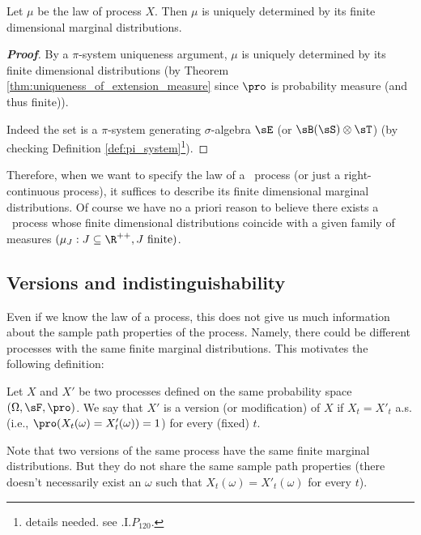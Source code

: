 \begin{proposition}\label{pro:process_law_is_uniquely_determined_by_its_finite_dimensional_marginal_distribution}
Let $\mu$ be the law of process $X$. Then $\mu$ is uniquely determined by its finite dimensional marginal distributions.
\end{proposition}

\begin{proof}[\bf Proof]
By a $\pi$-system uniqueness argument, $\mu$ is uniquely determined by its finite dimensional distributions (by Theorem \ref{thm:uniqueness_of_extension_measure} since $\pro$ is probability measure (and thus finite)).

Indeed the set
\be
{}
\ee
is a $\pi$-system generating $\sigma$-algebra $\sE$ (or $\sB(\sS)\otimes \sT$) (by checking Definition \ref{def:pi_system}\footnote{details needed. see \cite{Rogers_1994}.I.$P_{120}$.}).
\end{proof}

Therefore, when we want to specify the law of a \cadlag\ process (or just a right-continuous process), it suffices to describe its finite dimensional marginal distributions. Of course we have no a priori reason to believe there exists a \cadlag\ process whose finite dimensional distributions coincide with a given family of measures $(\mu_J : J \subseteq \R^{++}, J\text{ finite})$.

\subsection{Versions and indistinguishability}

Even if we know the law of a process, this does not give us much information about the sample path properties of the process. Namely, there could be different processes with the same finite marginal distributions. This motivates the following definition:

\begin{definition}\label{def:version_process}
Let $X$ and $X'$ be two processes defined on the same probability space $(\Omega,\sF,\pro)$. We say that $X'$ is a version (or modification) of $X$ if $X_t = X'_t$ a.s. (i.e., $\pro(X_t(\omega) = X'_t(\omega)) = 1$) for every (fixed) $t$.
\end{definition}

\begin{remark}
Note that two versions of the same process have the same finite marginal distributions. But they do not share the same sample path properties (there doesn't necessarily exist an $\omega$ such that $X_t(\omega) = X'_t(\omega)$ for every $t$).
\end{remark}

